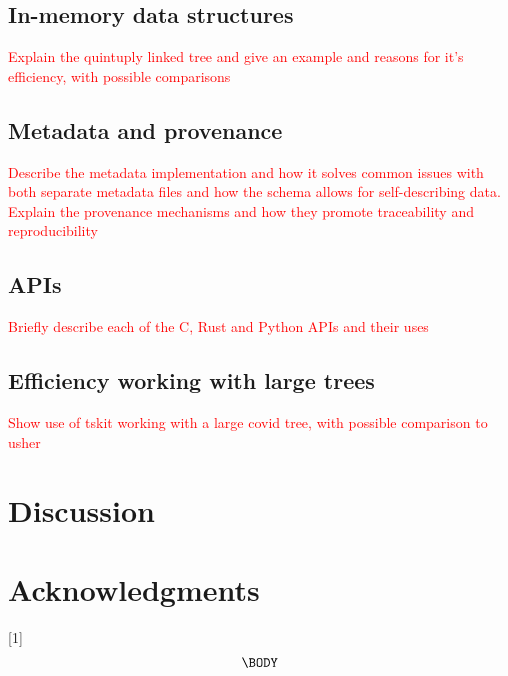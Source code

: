 \documentclass{article}
\newcommand{\jkcomment}[1]{\textcolor{red}{#1}}
\begin{document}
\subsection*{In-memory data structures}
\jkcomment{Explain the quintuply linked tree and give an example and reasons for it's
efficiency, with possible comparisons}

\subsection*{Metadata and provenance}
\jkcomment{Describe the metadata implementation and how it solves common issues with both
separate metadata files and how the schema allows for self-describing data. Explain the
provenance mechanisms and how they promote traceability and reproducibility}

\subsection*{APIs}
\jkcomment{Briefly describe each of the C, Rust and Python APIs and their uses}

\subsection*{Efficiency working with large trees}
\jkcomment{Show use of tskit working with a large covid tree, with possible comparison
to usher}


\section*{Discussion}

\section*{Acknowledgments}





 \newcommand{\be}{\begin{equation}}
 \newcommand{\ee}{\end{equation}}
 \newcommand{\bd}{\begin{displaymath}}
 \newcommand{\ed}{\end{displaymath}}
\newcommand{\IN}{\ensuremath{\mathds{N}}}%
\newcommand{\EE}[1]{\ensuremath{\mathds{E}\left[ #1 \right]}}%
\newcommand{\one}[1]{\ensuremath{\mathds{1}_{\left\{ #1 \right\}}}}%
\newcommand{\prb}[1]{\ensuremath{\mathds{P}\left( #1 \right) } }%

[1]{%
\begin{equation}
\label{#1}
\begin{split}
  \BODY
\end{split}\end{equation}
}

\setcounter{secnumdepth}{2} %

\appendix
\end{document}
